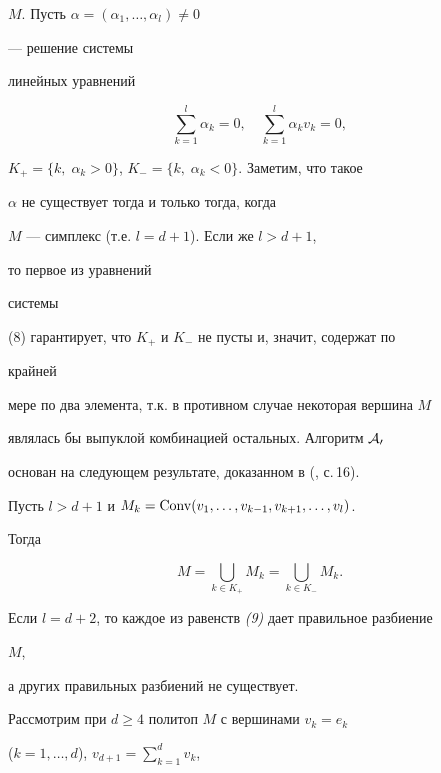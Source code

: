 $M$. Пусть $\alpha=(\alpha_1,\dotsc,\alpha_l)\ne 0$


--- решение системы


линейных уравнений


\begin{equation}


\sum^l_{k=1}\alpha_k=0,\quad


\sum^l_{k=1}\alpha_k v_k=0,


\end{equation}


$K_+=\{k,\;\alpha_k>0\}$, $K_-=\{k,\;\alpha_k<0\}$. Заметим, что такое


$\alpha$ не существует тогда и только тогда, когда


$M$ --- симплекс (т.е. $l=d+1$). Если же $l>d+1$,


то первое из уравнений


системы


(8) гарантирует, что $K_+$ и $K_-$ не пусты и, значит, содержат по


крайней


мере по два элемента, т.к. в противном случае некоторая вершина $M$


являлась бы выпуклой комбинацией остальных. Алгоритм $\cal A_0$


основан на следующем результате, доказанном в (\cite{S1}, с.\,16).





\begin{lem}


Пусть $l>d+1$ и $M_k=\operatorname{Conv}(v_1,\dotsc,v_{k-1},v_{k+1},\dotsc,v_l)$.


Тогда


\begin{equation}


M=\bigcup_{k\in K_+}M_k=\bigcup_{k\in K_-}M_k.


\end{equation}


Если $l=d+2$, то каждое из равенств {\em (9)} дает правильное разбиение


$M$,


а других правильных разбиений не существует.


\end{lem}





Рассмотрим при $d\ge 4$ политоп $M$ с вершинами $v_k=e_k$


($k=1,\dotsc,d$), $v_{d+1}=\sum\limits^d_{k=1}v_k$,


